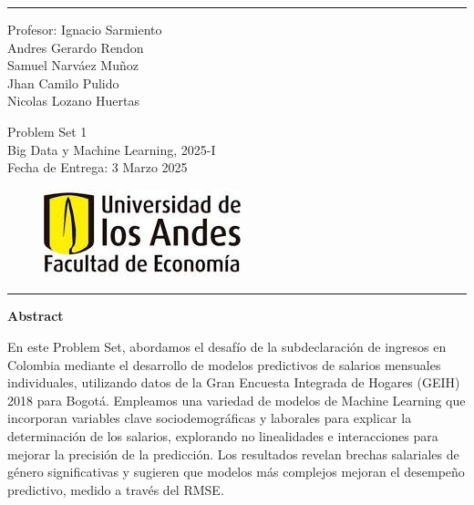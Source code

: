 \documentclass[10pt]{article}
\begin{document}


\hrule \medskip 
\noindent%
\begin{minipage}{0.298999\textwidth} 
\raggedright
Profesor: Ignacio Sarmiento\\
\vspace{2mm}
Andres Gerardo Rendon \\
Samuel Narváez Muñoz\\
Jhan Camilo Pulido\\
Nicolas Lozano Huertas\\

\end{minipage}
\noindent%
\begin{minipage}{0.4\textwidth} 
\centering 
\huge 
Problem Set 1\\ 
\vspace{2mm}
\normalsize 
Big Data y Machine Learning, 2025-I\\ 
Fecha de Entrega: 3 Marzo 2025
\end{minipage}
\noindent%
\begin{minipage}{0.298999\textwidth} 
\begin{figure}[H]
\raggedleft
\includegraphics[scale=0.55]{document/escudo2.jpg}
\end{figure}
\hfill
\end{minipage}
\medskip\hrule 
\bigskip

\thispagestyle{empty} %

\begin{center}
    \textbf{\large Abstract}
\end{center}

{En este Problem Set, abordamos el desafío de la subdeclaración de ingresos en Colombia mediante el desarrollo de modelos predictivos de salarios mensuales individuales, utilizando datos de la Gran Encuesta Integrada de Hogares (GEIH) 2018 para Bogotá. Empleamos una variedad de modelos de Machine Learning que incorporan variables clave sociodemográficas y laborales para explicar la determinación de los salarios, explorando no linealidades e interacciones para mejorar la precisión de la predicción. Los resultados revelan brechas salariales de género significativas y sugieren que modelos más complejos mejoran el desempeño predictivo, medido a través del RMSE.}
\end{document}
